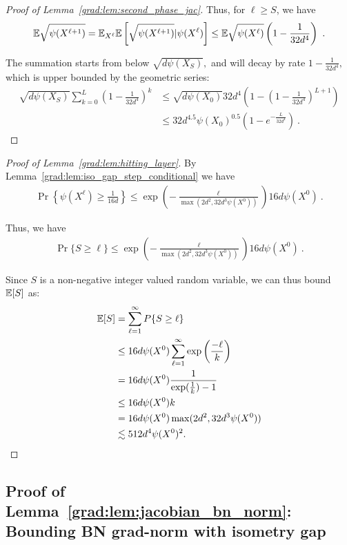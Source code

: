 \begin{proof}[Proof of Lemma~\ref{grad:lem:second_phase_jac}]
    Thus, for $\ell \ge S$, we have
    \begin{align} 
        \mathbb{E} \sqrt{\psi(X^{\ell + 1})} 
        = \mathbb{E}_{X^\ell} \mathbb{E} \left[\sqrt{\psi(X^{\ell + 1})}|\psi(X^\ell) \right] 
        \le \mathbb{E} \sqrt{\psi(X^\ell)}\left(1-\frac{1}{32d^4}\right)~.
    \end{align}

    The summation starts from below $\sqrt{d \psi(X_S)},$ and will decay by rate $1 - \frac{1}{32d^4},$ which is upper bounded by the geometric series:
    \begin{align}
        \sqrt{d \psi(X_S)}\sum_{k=0}^L \left(1- \frac{1}{32d^4}\right)^k &\le \sqrt{d \psi(X_0)} 32 d^4 \left(1 - \left(1 - \frac{1}{32 d^4}\right)^{L+1} \right) \\
        &\le 32 d^{4.5} \psi(X_0)^{0.5} \left(1 - e^{-\frac{L}{32 d^4}}\right)~.
    \end{align}
\end{proof}


\begin{proof}[Proof of Lemma~\ref{grad:lem:hitting_layer}]
By Lemma~\ref{grad:lem:iso_gap_step_conditional} we have
\begin{align}
    \Pr\left\{\psi(X^\ell) \geq \frac{1}{16d}\right\}
    \leq \exp \left(-\frac{\ell}{\max(2d^2, 32d^3\psi(X^0))}\right) 16d \psi(X^0)~.
\end{align}

Thus, we have 
\begin{align}
\Pr\{S \ge \ell\} 
\leq \exp \left(-\frac{\ell}{\max(2d^2, 32d^3\psi(X^0))}\right) 16d \psi(X^0)~.
\end{align}

Since $S$ is a non-negative integer valued random variable, we can thus bound $\mathbb{E}[S]$ as:
\begin{align}
    \mathbb{E}[S] &= \sum_{\ell=1}^\infty P\{S \geq \ell\} \\
    &\leq 16d\psi(X^0) \sum_{\ell=1}^\infty \exp\left(\frac{-\ell}{k}\right) \\
    &= 16d\psi(X^0) \frac{1}{\exp(\frac{1}{k}) - 1} \\
    &\leq 16d\psi(X^0) k \\
    &= 16d\psi(X^0) \max(2d^2, 32d^3\psi(X^0)) \\
    &\lesssim 512d^4 \psi(X^0)^2.
\end{align}
\end{proof}



\subsection*{Proof of Lemma~\ref{grad:lem:jacobian_bn_norm}: Bounding BN grad-norm with isometry gap}

